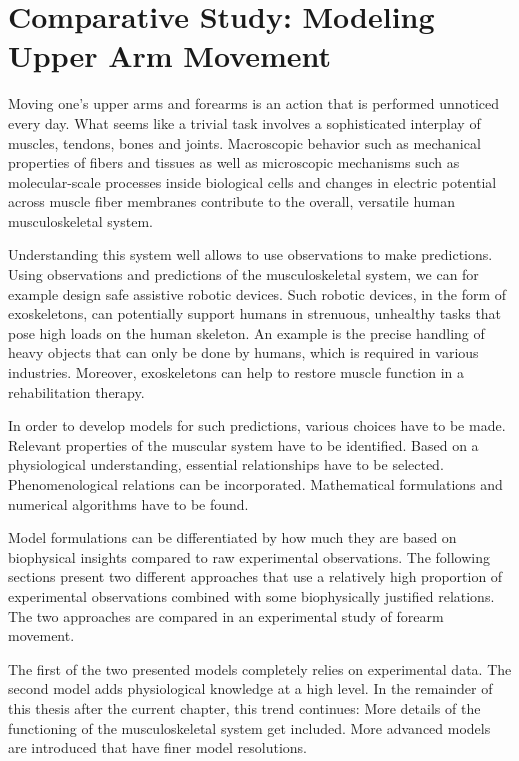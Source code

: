 
\chapter{Comparative Study: Modeling Upper Arm Movement}\label{chap:comparative_study}

Moving one's upper arms and forearms is an action that is performed unnoticed every day. 
What seems like a trivial task involves a sophisticated interplay of muscles, tendons, bones and joints. Macroscopic behavior such as mechanical properties of fibers and tissues as well as microscopic mechanisms such as molecular-scale processes inside biological cells and changes in electric potential across muscle fiber membranes contribute to the overall, versatile human musculoskeletal system.

Understanding this system well allows to use observations to make predictions.
Using observations and predictions of the musculoskeletal system, we can for example design safe assistive robotic devices.
Such robotic devices, in the form of exoskeletons, can potentially support humans in strenuous, unhealthy tasks that pose high loads on the human skeleton. An example is the precise handling of heavy objects that can only be done by humans, which is required in various industries. Moreover, exoskeletons can help to restore muscle function in a rehabilitation therapy.

In order to develop models for such predictions, various choices have to be made. 
Relevant properties of the muscular system have to be identified. Based on a physiological understanding, essential relationships have to be selected. Phenomenological relations can be incorporated. Mathematical formulations and numerical algorithms have to be found.

Model formulations can be differentiated by how much they are based on biophysical insights compared to raw experimental observations. The following sections present two different approaches that use a relatively high proportion of experimental observations combined with some biophysically justified relations. The two approaches are compared in an experimental study of forearm movement. 

The first of the two presented models completely relies on experimental data. The second model adds physiological knowledge at a high level. In the remainder of this thesis after the current chapter, this trend continues: More details of the functioning of the musculoskeletal system get included. More advanced models are introduced that have finer model resolutions.

